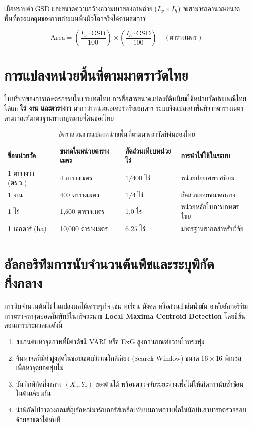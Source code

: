 เมื่อทราบค่า GSD และขนาดความกว้างความยาวของภาพถ่าย ($I_w \times I_h$) จะสามารถคำนวณขนาดพื้นที่ครอบคลุมของภาพถ่ายบนพื้นผิวโลกจริงได้ตามสมการ

\begin{equation}
\text{Area} = \left(\frac{I_w \cdot \text{GSD}}{100}\right) \times \left(\frac{I_h \cdot \text{GSD}}{100}\right) \quad (\text{ตารางเมตร})
\end{equation}

\section{การแปลงหน่วยพื้นที่ตามมาตราวัดไทย}

ในบริบทของการเกษตรกรรมในประเทศไทย การสื่อสารขนาดแปลงที่ดินนิยมใช้หน่วยวัดประเพณีไทย ได้แก่ \textbf{ไร่ งาน และตารางวา} มากกว่าหน่วยเอเคอร์หรือเฮกตาร์ ระบบจึงแปลงค่าพื้นที่จากตารางเมตรตามเกณฑ์มาตรฐานทางกฎหมายที่ดินของไทย

\begin{table}[H]
\caption{อัตราส่วนการแปลงหน่วยพื้นที่ตามมาตราวัดที่ดินของไทย}
\label{tab:thai_land_units}
\begin{tabularx}{\textwidth}{p{3.2cm}p{3.2cm}p{3.2cm}Y}
\toprule
\textbf{ชื่อหน่วยวัด} & \textbf{ขนาดในหน่วยตารางเมตร} & \textbf{สัดส่วนเทียบหน่วยไร่} & \textbf{การนำไปใช้ในระบบ} \\
 ตารางวา (ตร.ว.) & 4 ตารางเมตร & $1/400$ ไร่ & หน่วยย่อยเศษทศนิยม \\
1 งาน & 400 ตารางเมตร & $1/4$ ไร่ & สัดส่วนย่อยขนาดกลาง \\
1 ไร่ & 1,600 ตารางเมตร & 1.0 ไร่ & หน่วยหลักในการเกษตรไทย \\
1 เฮกตาร์ (ha) & 10,000 ตารางเมตร & 6.25 ไร่ & มาตรฐานสากลสำหรับวิจัย \\
\bottomrule
\end{tabularx}
\end{table}

\section{อัลกอริทึมการนับจำนวนต้นพืชและระบุพิกัดกึ่งกลาง}

การนับจำนวนต้นไม้ในแปลงผลไม้เศรษฐกิจ เช่น ทุเรียน มังคุด หรือสวนปาล์มน้ำมัน อาศัยอัลกอริทึมการตรวจหาจุดยอดสัมพัทธ์ในกริดระนาบ \textbf{Local Maxima Centroid Detection} โดยมีขั้นตอนการประมวลผลดังนี้
\begin{enumerate}
    \item สแกนค้นหาจุดภาพที่มีค่าดัชนี VARI หรือ ExG สูงกว่าเกณฑ์ความไวทรงพุ่ม
    \item ค้นหาจุดที่มีค่าสูงสุดในขอบเขตบริเวณใกล้เคียง (Search Window) ขนาด $16 \times 16$ พิกเซล เพื่อหาจุดยอดพุ่มไม้
    \item บันทึกพิกัดกึ่งกลาง $(X_c, Y_c)$ ของต้นไม้ พร้อมตรวจจับระยะห่างเพื่อไม่ให้เกิดการนับซ้ำซ้อนในต้นเดียวกัน
    \item นำพิกัดไปวาดวงกลมสัญลักษณ์มาร์กเกอร์สีเหลืองทับบนภาพถ่ายเพื่อให้นักบินสามารถตรวจสอบด้วยสายตาได้ทันที
\end{enumerate}

